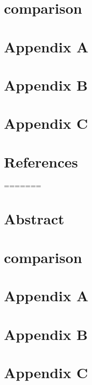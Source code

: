 




\maketitle
\vfill

\newpage
\tableofcontents
\newpage


\newpage

\newpage


\newpage

\newpage

\newpage
\section{comparison}
\newpage
\section{Appendix A}
\newpage
\section{Appendix B}
\newpage
\section{Appendix C}
\newpage
\section{References}

=======





\maketitle
\vfill
\section{Abstract}
\newpage
\tableofcontents
\newpage


\newpage

\newpage


\newpage

\newpage

\newpage
\section{comparison}
\newpage
\section{Appendix A}
\newpage
\section{Appendix B}
\newpage
\section{Appendix C}
\newpage


